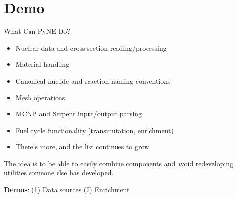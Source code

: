 \documentclass[xcolor=x11names,compress]{beamer}
\renewcommand{\(}{\begin{columns}}
\renewcommand{\)}{\end{columns}}
\newcommand{\<}[1]{\begin{column}{#1}}
\renewcommand{\>}{\end{column}}
\begin{document}
%
\section{Demo}
\begin{frame}{What Can PyNE Do?}

    \begin{itemize}
    \item Nuclear data and cross-section reading/processing
    \item Material handling
    \item Canonical nuclide and reaction naming conventions
    \item Mesh operations
    \item MCNP and Serpent input/output parsing
    \item Fuel cycle functionality (transmutation, enrichment)
    \item There's more, and the list continues to grow
    \end{itemize}
    
    The idea is to be able to easily combine components and avoid redeveloping
    utilities someone else has developed.
    
    \begin{center}
    \textbf{Demos}: (1) Data sources \hspace*{3 em} (2) Enrichment
    \end{center}

\end{frame}
\end{document}
